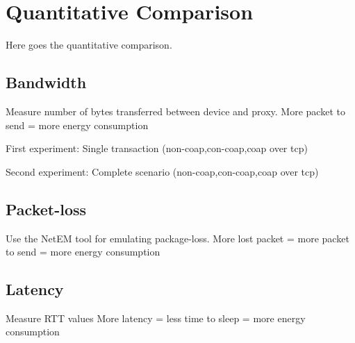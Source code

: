 \section{Quantitative Comparison}
Here goes the quantitative comparison.

\subsection{Bandwidth}
Measure number of bytes transferred between device and proxy.
More packet to send = more energy consumption

First experiment:
Single transaction (non-coap,con-coap,coap over tcp)

Second experiment:
Complete scenario (non-coap,con-coap,coap over tcp)


\subsection{Packet-loss}
Use the NetEM tool for emulating package-loss.
More lost packet = more packet to send = more energy consumption

\subsection{Latency}
Measure RTT values %
More latency = less time to sleep = more energy consumption